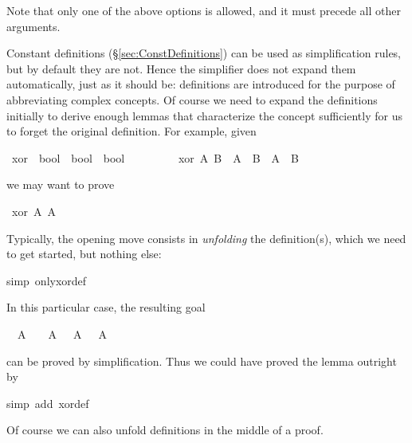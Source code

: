 \begin{isabellebody}
\begin{isamarkuptext}
Note that only one of the above options is allowed, and it must precede all
other arguments.%
\end{isamarkuptext}%
%
%
\begin{isamarkuptext}%
Constant definitions (\S\ref{sec:ConstDefinitions}) can
be used as simplification rules, but by default they are not.  Hence the
simplifier does not expand them automatically, just as it should be:
definitions are introduced for the purpose of abbreviating complex
concepts. Of course we need to expand the definitions initially to derive
enough lemmas that characterize the concept sufficiently for us to forget the
original definition. For example, given%
\end{isamarkuptext}%
\ xor\ {\isacharcolon}{\isacharcolon}\ {\isachardoublequote}bool\ {\isasymRightarrow}\ bool\ {\isasymRightarrow}\ bool{\isachardoublequote}\isanewline
\ \ \ \ \ \ \ \ \ {\isachardoublequote}xor\ A\ B\ {\isasymequiv}\ {\isacharparenleft}A\ {\isasymand}\ {\isasymnot}B{\isacharparenright}\ {\isasymor}\ {\isacharparenleft}{\isasymnot}A\ {\isasymand}\ B{\isacharparenright}{\isachardoublequote}%
\begin{isamarkuptext}%
\noindent
we may want to prove%
\end{isamarkuptext}%
\ {\isachardoublequote}xor\ A\ {\isacharparenleft}{\isasymnot}A{\isacharparenright}{\isachardoublequote}%
\begin{isamarkuptxt}%
\noindent
Typically, the opening move consists in \emph{unfolding} the definition(s), which we need to
get started, but nothing else:%
\end{isamarkuptxt}%
simp\ only{\isacharcolon}xor{\isacharunderscore}def{\isacharparenright}%
\begin{isamarkuptxt}%
\noindent
In this particular case, the resulting goal
\begin{isabelle}%
\ {}{\isachardot}\ A\ {\isasymand}\ {\isasymnot}\ {\isasymnot}\ A\ {\isasymor}\ {\isasymnot}\ A\ {\isasymand}\ {\isasymnot}\ A%
\end{isabelle}
can be proved by simplification. Thus we could have proved the lemma outright by%
\end{isamarkuptxt}%
simp\ add{\isacharcolon}\ xor{\isacharunderscore}def{\isacharparenright}%
\begin{isamarkuptext}%
\noindent
Of course we can also unfold definitions in the middle of a proof.


\end{isamarkuptext}
\end{isabellebody}
